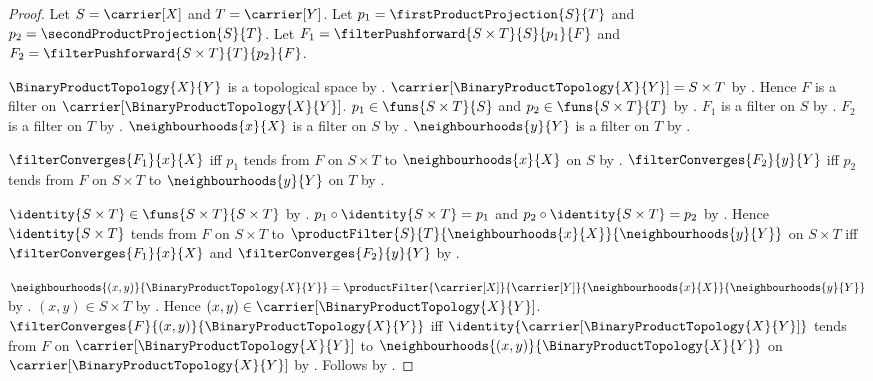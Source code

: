 \begin{proof}
    Let $S=\carrier[X]$ and $T=\carrier[Y]$.
    Let $p_1=\firstProductProjection{S}{T}$ and
        $p_2=\secondProductProjection{S}{T}$.
    Let $F_1=\filterPushforward{S\times T}{S}{p_1}{F}$ and
        $F_2=\filterPushforward{S\times T}{T}{p_2}{F}$.

    $\BinaryProductTopology{X}{Y}$ is a topological space by
        .
    $\carrier[\BinaryProductTopology{X}{Y}]=S\times T$ by
        .
    Hence $F$ is a filter on
        $\carrier[\BinaryProductTopology{X}{Y}]$.
    $p_1\in\funs{S\times T}{S}$ and
        $p_2\in\funs{S\times T}{T}$ by
        .
    $F_1$ is a filter on $S$ by
        .
    $F_2$ is a filter on $T$ by
        .
    $\neighbourhoods{x}{X}$ is a filter on $S$ by
        .
    $\neighbourhoods{y}{Y}$ is a filter on $T$ by
        .

    $\filterConverges{F_1}{x}{X}$ iff
        $p_1$ tends from $F$ on $S\times T$ to
            $\neighbourhoods{x}{X}$ on $S$ by
        .
    $\filterConverges{F_2}{y}{Y}$ iff
        $p_2$ tends from $F$ on $S\times T$ to
            $\neighbourhoods{y}{Y}$ on $T$ by
        .

    $\identity{S\times T}\in\funs{S\times T}{S\times T}$ by
        .
    $p_1\circ\identity{S\times T}=p_1$ and
        $p_2\circ\identity{S\times T}=p_2$ by
        .
    Hence $\identity{S\times T}$ tends from $F$ on $S\times T$ to
        $\productFilter{S}{T}{
            \neighbourhoods{x}{X}}{\neighbourhoods{y}{Y}}$ on
            $S\times T$ iff
        $\filterConverges{F_1}{x}{X}$ and
        $\filterConverges{F_2}{y}{Y}$ by
        .

    $\neighbourhoods{(x,y)}{\BinaryProductTopology{X}{Y}}
        =\productFilter{\carrier[X]}{\carrier[Y]}{
            \neighbourhoods{x}{X}}{\neighbourhoods{y}{Y}}$ by
        .
    $(x,y)\in S\times T$ by .
    Hence $(x,y)\in\carrier[\BinaryProductTopology{X}{Y}]$.
    $\filterConverges{F}{(x,y)}{\BinaryProductTopology{X}{Y}}$ iff
        $\identity{\carrier[\BinaryProductTopology{X}{Y}]}$ tends from
            $F$ on $\carrier[\BinaryProductTopology{X}{Y}]$ to
            $\neighbourhoods{(x,y)}{\BinaryProductTopology{X}{Y}}$ on
            $\carrier[\BinaryProductTopology{X}{Y}]$ by
        .
    Follows by \auto.
\end{proof}

